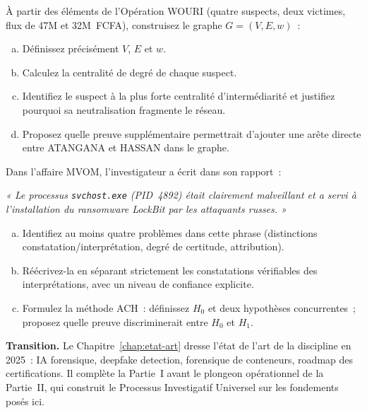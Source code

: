 \begin{boxexo}[title={\ding{45}\quad Exercice~4.2 --- Graphe WOURI \niveaumoyen}]
À partir des éléments de l'Opération WOURI (quatre suspects, deux victimes,
flux de 47M et 32M~FCFA), construisez le graphe $G = (V, E, w)$~:
\begin{enumerate}[(a)]
    \item Définissez précisément $V$, $E$ et $w$.
    \item Calculez la centralité de degré de chaque suspect.
    \item Identifiez le suspect à la plus forte centralité d'intermédiarité
          et justifiez pourquoi sa neutralisation fragmente le réseau.
    \item Proposez quelle preuve supplémentaire permettrait d'ajouter une
          arête directe entre ATANGANA et HASSAN dans le graphe.
\end{enumerate}
\end{boxexo}

\begin{boxexo}[title={\ding{45}\quad Exercice~4.3 --- Admissibilité et ACH \niveauexpert}]
Dans l'affaire MVOM, l'investigateur a écrit dans son rapport~:

\medskip
\textit{« Le processus \texttt{svchost.exe} (PID~4892) était clairement
malveillant et a servi à l'installation du ransomware LockBit par les
attaquants russes. »}
\medskip

\begin{enumerate}[(a)]
    \item Identifiez au moins quatre problèmes dans cette phrase (distinctions
          constatation/interprétation, degré de certitude, attribution).
    \item Réécrivez-la en séparant strictement les constatations vérifiables
          des interprétations, avec un niveau de confiance explicite.
    \item Formulez la méthode ACH~: définissez $H_0$ et deux hypothèses
          concurrentes~; proposez quelle preuve discriminerait entre $H_0$
          et $H_1$.
\end{enumerate}
\end{boxexo}

\bigskip

\begin{boxinfo}
\textbf{Transition.} Le Chapitre~\ref{chap:etat-art} dresse l'état de l'art
de la discipline en 2025~: IA forensique, deepfake detection, forensique de
conteneurs, roadmap des certifications. Il complète la Partie~I avant le
plongeon opérationnel de la Partie~II, qui construit le Processus Investigatif
Universel sur les fondements posés ici.
\end{boxinfo}